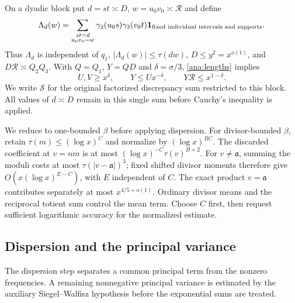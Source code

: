 On a dyadic block put $d=st\asymp D$, $w=u_0v_0\asymp\mathcal R$ and
define
\begin{equation}
 \Lambda_d(w)=\sum_{\substack{st=d\\u_0v_0=w}}
       \gamma_2(u_0s)\gamma_3(v_0t)
       \mathbf 1_{\text{fixed individual intervals and supports}}.
 \label{ana:Lambda}
\end{equation}
Thus $\Lambda_d$ is independent of $q_1$,
$|\Lambda_d(w)|\le\tau(dw)$, $D\le y^2=x^{o(1)}$, and
$D\mathcal R\asymp Q_2Q_3$. With $Q=Q_1$, $Y=QD$ and
$\delta=\sigma/3$, \eqref{ana:lengths} implies
\begin{equation}
 U,V\ge x^\delta,\qquad Y\le Ux^{-\delta},\qquad
 Y\mathcal R\le x^{1-\delta}.
 \label{ana:dispersion-lengths}
\end{equation}
We write $\mathcal S$ for the original factorized discrepancy sum
restricted to this block. All values of $d\asymp D$ remain in this
single sum before Cauchy's inequality is applied.

We reduce to one-bounded $\beta$ before applying dispersion. For
divisor-bounded $\beta$, retain $\tau(m)\le(\log x)^C$ and normalize
by $(\log x)^{BC}$. The discarded coefficient at $v=nm$ is at most
$(\log x)^{-C}\tau(v)^{B+2}$. For $v\ne\mathfrak a$, summing the
moduli costs at most $\tau(|v-\mathfrak a|)^3$; fixed shifted divisor
moments therefore give $O(x(\log x)^{E-C})$, with $E$ independent
of $C$. The exact product $v=\mathfrak a$ contributes separately at
most $x^{4/5+o(1)}$. Ordinary divisor means and the reciprocal
totient sum control the mean term. Choose $C$ first, then request
sufficient logarithmic accuracy for the normalized estimate.

\subsection{Dispersion and the principal variance}

The dispersion step separates a common principal term from the
nonzero frequencies. A remaining nonnegative principal variance is
estimated by the auxiliary Siegel--Walfisz hypothesis before the
exponential sums are treated.

